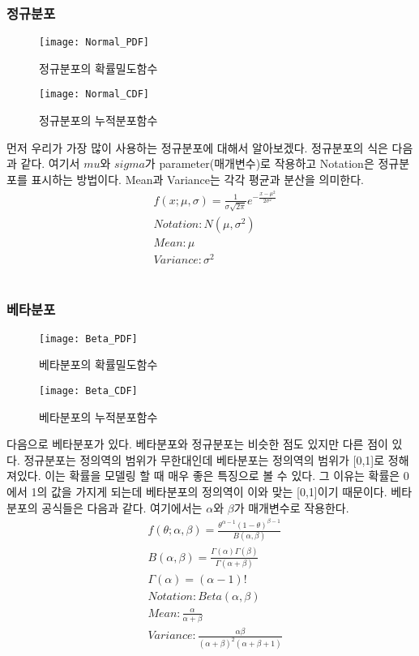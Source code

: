 \documentclass[a4paper]{oblivoir}
\begin{document}
\subsubsection{정규분포}
\begin{figure}[ht]\centering
\parbox[t]{5.2cm}{\texttt{[image: Normal\_PDF]}\caption{정규분포의 확률밀도함수}\label{Fig:1-26}}\hspace{0.5cm}
\parbox[t]{5.2cm}{\texttt{[image: Normal\_CDF]}\caption{정규분포의 누적분포함수}\label{Fig:1-27}}
\end{figure}
\indent 먼저 우리가 가장 많이 사용하는 정규분포에 대해서 알아보겠다. 정규분포의 식은 다음과 같다. 여기서 $mu$와 $sigma$가 parameter(매개변수)로 작용하고 Notation은 정규분포를 표시하는 방법이다. Mean과 Variance는 각각 평균과 분산을 의미한다.
\begin{align}
&f(x;\mu,\sigma)=\frac{1}{\sigma\sqrt{2\pi}} e^{-\frac{{x-\mu}^2}{2\sigma^2}}\label{eq:1-37}\\
&Notation : N(\mu,\sigma^2)\\
&Mean : \mu\\
&Variance : \sigma^2
\end{align}
\\

\subsubsection{베타분포}
\begin{figure}[ht]\centering
\parbox[t]{5.2cm}{\texttt{[image: Beta\_PDF]}\caption{베타분포의 확률밀도함수}\label{Fig:1-28}}\hspace{0.5cm}
\parbox[t]{5.2cm}{\texttt{[image: Beta\_CDF]}\caption{베타분포의 누적분포함수}\label{Fig:1-29}}
\end{figure}
\indent 다음으로 베타분포가 있다. 베타분포와 정규분포는 비슷한 점도 있지만 다른 점이 있다. 정규분포는 정의역의 범위가 무한대인데 베타분포는 정의역의 범위가 [0,1]로 정해져있다. 이는 확률을 모델링 할 때 매우 좋은 특징으로 볼 수 있다. 그 이유는 확률은 0에서 1의 값을 가지게 되는데 베타분포의 정의역이 이와 맞는 [0,1]이기 때문이다. 베타분포의 공식들은 다음과 같다. 여기에서는 $\alpha$와 $\beta$가 매개변수로 작용한다.\\
\begin{align}
&f(\theta ;\alpha,\beta)=\frac{\theta^{\alpha -1}(1-\theta)^{\beta -1}}{B(\alpha,\beta)}\label{eq:1-38}\\
&B(\alpha,\beta)=\frac{\Gamma(\alpha)\Gamma(\beta)}{\Gamma(\alpha +\beta)}\label{eq:1-39}\\
&\Gamma(\alpha)=(\alpha -1)!\label{eq:1-40}\\
&Notation:Beta(\alpha,\beta)\label{eq:1-41}\\
&Mean:\frac{\alpha}{\alpha+\beta}\label{eq:1-42}\\
&Variance:\frac{\alpha\beta}{(\alpha+\beta)^2(\alpha+\beta+1)}\label{eq:1-43}
\end{align}
\\
\end{document}
